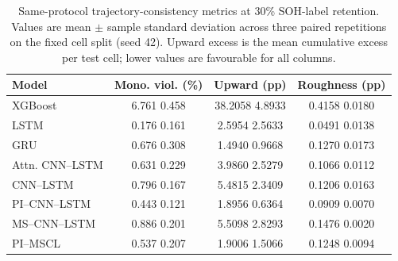 \begin{table}[htbp]
\caption{Same-protocol trajectory-consistency metrics at 30\% SOH-label retention. Values are mean $\pm$ sample standard deviation across three paired repetitions on the fixed cell split (seed 42). Upward excess is the mean cumulative excess per test cell; lower values are favourable for all columns.}
\label{tab:all_models_trajectory_sparse}
\centering
\setlength{\tabcolsep}{3.0pt}
\begin{tabular*}{\textwidth}{@{\extracolsep{\fill}}lccc@{}}
\toprule
Model & Mono. viol. (\%) & Upward (pp) & Roughness (pp) \\
\midrule
XGBoost & 6.761 \textpm{} 0.458 & 38.2058 \textpm{} 4.8933 & 0.4158 \textpm{} 0.0180 \\
LSTM & 0.176 \textpm{} 0.161 & 2.5954 \textpm{} 2.5633 & 0.0491 \textpm{} 0.0138 \\
GRU & 0.676 \textpm{} 0.308 & 1.4940 \textpm{} 0.9668 & 0.1270 \textpm{} 0.0173 \\
Attn. CNN--LSTM & 0.631 \textpm{} 0.229 & 3.9860 \textpm{} 2.5279 & 0.1066 \textpm{} 0.0112 \\
CNN--LSTM & 0.796 \textpm{} 0.167 & 5.4815 \textpm{} 2.3409 & 0.1206 \textpm{} 0.0163 \\
PI--CNN--LSTM & 0.443 \textpm{} 0.121 & 1.8956 \textpm{} 0.6364 & 0.0909 \textpm{} 0.0070 \\
MS--CNN--LSTM & 0.886 \textpm{} 0.201 & 5.5098 \textpm{} 2.8293 & 0.1476 \textpm{} 0.0020 \\
PI--MSCL & 0.537 \textpm{} 0.207 & 1.9006 \textpm{} 1.5066 & 0.1248 \textpm{} 0.0094 \\
\bottomrule
\end{tabular*}
\end{table}
